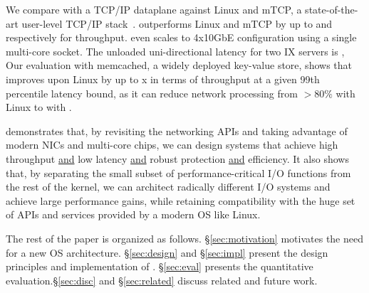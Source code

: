 We compare \ix with a TCP/IP dataplane against Linux
 and mTCP, a state-of-the-art user-level TCP/IP
stack~\cite{jeong2014mtcp}.  \ix outperforms Linux and mTCP by up to
 and  respectively for throughput. \ix
even scales to 4x10GbE configuration using a single multi-core socket.
The unloaded uni-directional latency for two IX servers is
\microsecond, 
Our evaluation with memcached, a widely deployed key-value store,
shows that \ix improves upon Linux by up to x in terms
of throughput at a given 99th percentile latency bound, as it can
reduce network processing from $>80\%$ with Linux to  with \ix.

\ix demonstrates that, by revisiting the networking APIs and taking
advantage of modern NICs and multi-core chips, we can design systems
that achieve high throughput \underline{and} low latency
\underline{and} robust protection \underline{and} efficiency. It also
shows that, by separating the small subset of performance-critical I/O
functions from the rest of the kernel, we can architect radically
different I/O systems and achieve large performance gains, while
retaining compatibility with the huge set of APIs and services
provided by a modern OS like Linux.

The rest of the paper is organized as follows. \S\ref{sec:motivation}
motivates the need for a new OS architecture. \S\ref{sec:design} and
\S\ref{sec:impl} present the design principles and implementation of
\ix. \S\ref{sec:eval} presents the quantitative
evaluation.\S\ref{sec:disc} and \S\ref{sec:related} discuss related
and future work.







